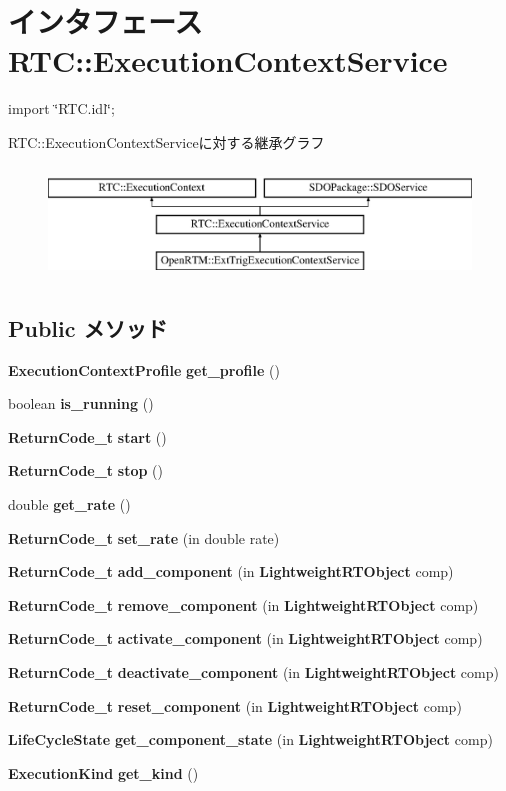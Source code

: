 \section{インタフェース RTC::ExecutionContextService}
\label{interfaceRTC_1_1ExecutionContextService}


{\ttfamily import \char`\"{}RTC.idl\char`\"{};}

RTC::ExecutionContextServiceに対する継承グラフ\begin{figure}[H]
\begin{center}
\leavevmode
\includegraphics[height=3cm]{interfaceRTC_1_1ExecutionContextService}
\end{center}
\end{figure}
\subsection*{Public メソッド}
\begin{DoxyCompactItemize}
\item 
{\bf ExecutionContextProfile} {\bf get\_\-profile} ()
\item 
boolean {\bf is\_\-running} ()
\item 
{\bf ReturnCode\_\-t} {\bf start} ()
\item 
{\bf ReturnCode\_\-t} {\bf stop} ()
\item 
double {\bf get\_\-rate} ()
\item 
{\bf ReturnCode\_\-t} {\bf set\_\-rate} (in double rate)
\item 
{\bf ReturnCode\_\-t} {\bf add\_\-component} (in {\bf LightweightRTObject} comp)
\item 
{\bf ReturnCode\_\-t} {\bf remove\_\-component} (in {\bf LightweightRTObject} comp)
\item 
{\bf ReturnCode\_\-t} {\bf activate\_\-component} (in {\bf LightweightRTObject} comp)
\item 
{\bf ReturnCode\_\-t} {\bf deactivate\_\-component} (in {\bf LightweightRTObject} comp)
\item 
{\bf ReturnCode\_\-t} {\bf reset\_\-component} (in {\bf LightweightRTObject} comp)
\item 
{\bf LifeCycleState} {\bf get\_\-component\_\-state} (in {\bf LightweightRTObject} comp)
\item 
{\bf ExecutionKind} {\bf get\_\-kind} ()
\end{DoxyCompactItemize}


